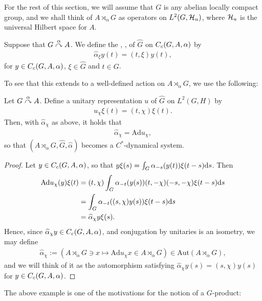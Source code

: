 For the rest of this section, we will assume that $G$ is any abelian locally compact group, and we shall think of $A \rtimes_\alpha G$ as operators on $L^2(G,\mathcal{H}_u)$, where $\mathcal{H}_u$ is the universal Hilbert space for $A$.
\begin{definition}
	Suppose that $G \stackrel{\alpha}{\curvearrowright} A$. We define the , \myemph{$\hat \alpha$}, of $\hat G$ on $C_c(G,A,\alpha)$ by
\begin{align*}
	\hat \alpha_\xi y(t) =  (t,\xi) y(t),
\end{align*}
for $y \in C_c(G,A,\alpha)$, $\xi \in \hat G$ and $t \in G$.
\end{definition}
To see that this extends to a well-defined action on $A \rtimes_\alpha G$, we use the following:
\begin{lemma}
Let $G \stackrel{\alpha}{\curvearrowright} A$. Define a unitary representation $u$ of $\hat G$ on $L^2(G,H)$ by
\begin{align*}
	u_\chi \xi(t) = (t, \chi) \xi(t).
\end{align*}
Then, with $\hat \alpha_\chi$ as above, it holds that
\begin{align*}
	\hat \alpha_\chi = \mathrm{Ad} u_\chi,
\end{align*}
so that $(A \rtimes_\alpha G, \hat G, \hat \alpha)$ becomes a $C^*$-dynamical system.
\label{dualaction}
\end{lemma}
\begin{proof}
Let $y \in C_c(G,A,\alpha)$, so that $y \xi(s) = \int_G \alpha_{-s}(y(t))\xi(t-s) \mathrm{d} s$. Then
\begin{align*}
	\mathrm{Ad} u_{\chi}(y) \xi(t) &= (t, \chi) \int_G \alpha_{-t}(y(s)) (t, - \chi)(-s,-\chi) \xi(t-s) \mathrm{d} s\\
	&= \int_G \alpha_{-t}( (s,\chi) y(s)) \xi(t-s) \mathrm{d} s \\
	&= \widehat{\alpha}_{\chi}y \xi(s).
\end{align*}
Hence, since $\widehat{\alpha}_\chi y \in C_c(G,A,\alpha)$, and conjugation by unitaries is an isometry, we may define 
\begin{align*}
	\hat \alpha_\chi := (A \rtimes_\alpha G \ni x \mapsto \mathrm{Ad} u_\chi x \in A \rtimes_\alpha G) \in \mathrm{Aut}(A \rtimes_\alpha G),
\end{align*}
and we will think of it as the automorphism satisfying $\hat \alpha_\chi y(s) = (s,\chi) y(s)$ for $y \in C_c(G,A,\alpha)$.
\end{proof}
The above example is one of the motivations for the notion of a $G$-product:
